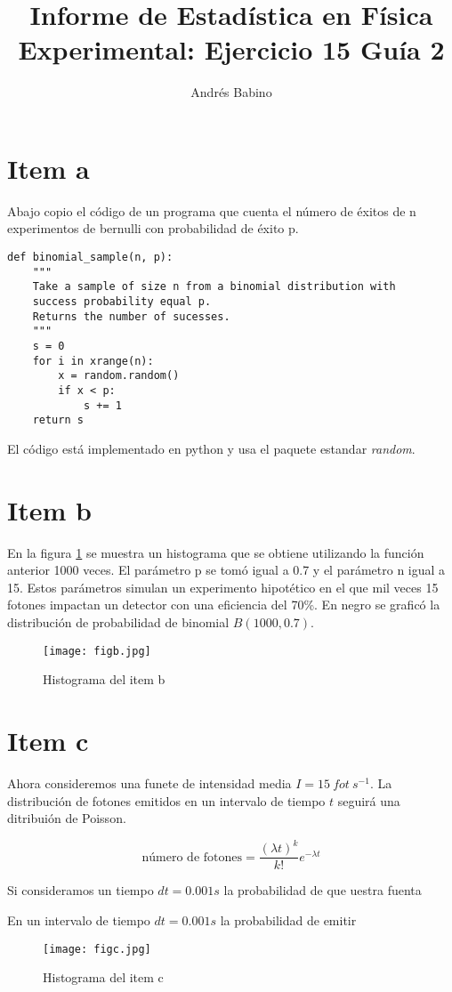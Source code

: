 \documentclass{article}
\title{Informe de Estadística en Física Experimental: Ejercicio 15 Guía 2}
\author{Andr\'es Babino}
\begin{document}
\maketitle

\section{Item a}
Abajo copio el código de un programa que cuenta el número de éxitos de n experimentos de bernulli  con probabilidad de éxito p.
\begin{lstlisting}
def binomial_sample(n, p):
    """
    Take a sample of size n from a binomial distribution with
    success probability equal p.
    Returns the number of sucesses.
    """
    s = 0
    for i in xrange(n):
        x = random.random()
        if x < p:
            s += 1
    return s
\end{lstlisting}
El código está implementado en python y usa el paquete estandar \textit{random}.

\section{Item b}
En la figura \ref{fig:itemb} se muestra un histograma que se obtiene utilizando la función anterior 1000 veces. 
El parámetro p se tomó igual a 0.7 y el parámetro n igual a 15.
Estos parámetros simulan un experimento hipotético en el que mil veces 15 fotones impactan un detector con una eficiencia del 70\%.
En negro se graficó la distribución de probabilidad de binomial $B(1000, 0.7)$.

\begin{figure}
\centering
\texttt{[image: figb.jpg]}
\caption[]{Histograma del item b}
\label{fig:itemb}
\end{figure}

\section{Item c}
Ahora consideremos una funete de intensidad media $I=15\ fot\ s^{-1}$.
La distribución de fotones emitidos en un intervalo de tiempo $t$ seguirá una ditribuión de Poisson.

$$\text{número\ de\ fotones} = \frac{(\lambda t)^k}{k!} e^{-\lambda t}$$

Si consideramos un tiempo $dt=0.001s$ la probabilidad de que uestra fuenta

En un intervalo de tiempo $dt=0.001s$ la probabilidad de emitir  
\begin{figure}
\centering
\texttt{[image: figc.jpg]}
\caption[]{Histograma del item c}
\label{fig:itemc}
\end{figure}
\end{document}

